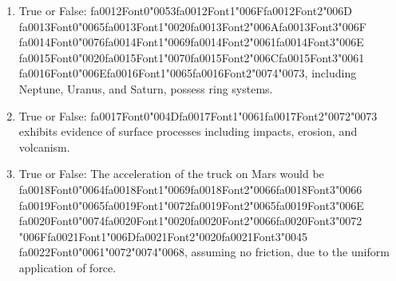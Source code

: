 \documentclass[12pt]{article}
\begin{document}
\begin{enumerate}[label=\arabic*.]
\item True or False: {\csname fa0012Font0\endcsname\char"0053}{\csname fa0012Font1\endcsname\char"006F}{\csname fa0012Font2\endcsname\char"006D} {\csname fa0013Font0\endcsname\char"0065}{\csname fa0013Font1\endcsname\char"0020}{\csname fa0013Font2\endcsname\char"006A}{\csname fa0013Font3\endcsname\char"006F} {\csname fa0014Font0\endcsname\char"0076}{\csname fa0014Font1\endcsname\char"0069}{\csname fa0014Font2\endcsname\char"0061}{\csname fa0014Font3\endcsname\char"006E} {\csname fa0015Font0\endcsname\char"0020}{\csname fa0015Font1\endcsname\char"0070}{\csname fa0015Font2\endcsname\char"006C}{\csname fa0015Font3\endcsname\char"0061} {\csname fa0016Font0\endcsname\char"006E}{\csname fa0016Font1\endcsname\char"0065}{\csname fa0016Font2\endcsname\char"0074}{\char"0073}, including Neptune, Uranus, and Saturn, possess ring systems.
\item True or False: {\csname fa0017Font0\endcsname\char"004D}{\csname fa0017Font1\endcsname\char"0061}{\csname fa0017Font2\endcsname\char"0072}{\char"0073} exhibits evidence of surface processes including impacts, erosion, and volcanism.
\item True or False: The acceleration of the truck on Mars would be {\csname fa0018Font0\endcsname\char"0064}{\csname fa0018Font1\endcsname\char"0069}{\csname fa0018Font2\endcsname\char"0066}{\csname fa0018Font3\endcsname\char"0066} {\csname fa0019Font0\endcsname\char"0065}{\csname fa0019Font1\endcsname\char"0072}{\csname fa0019Font2\endcsname\char"0065}{\csname fa0019Font3\endcsname\char"006E} {\csname fa0020Font0\endcsname\char"0074}{\csname fa0020Font1\endcsname\char"0020}{\csname fa0020Font2\endcsname\char"0066}{\csname fa0020Font3\endcsname\char"0072} {\char"006F}{\csname fa0021Font1\endcsname\char"006D}{\csname fa0021Font2\endcsname\char"0020}{\csname fa0021Font3\endcsname\char"0045} {\csname fa0022Font0\endcsname\char"0061}{\char"0072}{\char"0074}{\char"0068}, assuming no friction, due to the uniform application of force.
\end{enumerate}
\end{document}
